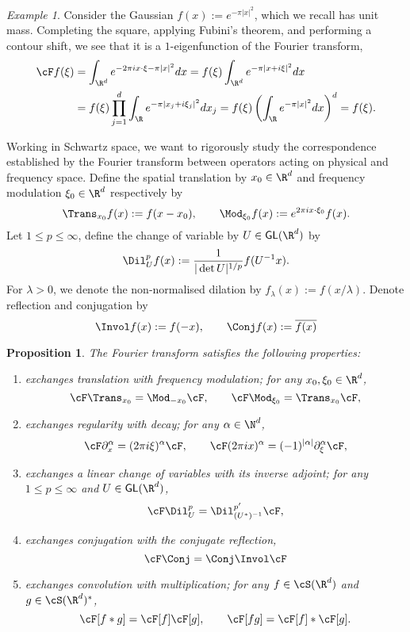 \documentclass[reqno]{amsart}
\newtheorem{proposition}[theorem]{Proposition}
\theoremstyle{definition}
\theoremstyle{remark}
\newtheorem*{example}{Example}
\begin{document}
\begin{example}
	Consider the Gaussian $f(x) := e^{-\pi |x|^2}$, which we recall has unit mass. Completing the square, applying Fubini's theorem, and performing a contour shift, we see that it is a $1$-eigenfunction of the Fourier transform, 
	\begin{align*}
		\cF f(\xi) 
			&= \int_{\R^d} e^{-2\pi i x \cdot \xi - \pi |x|^2} d x = f(\xi) \int_{\R^d} e^{-\pi |x + i \xi|^2} d x \\
			&= f(\xi) \prod_{j = 1}^d  \int_{\R} e^{-\pi |x_j + i \xi_j|^2} d x_j = f(\xi) \left( \int_{\R} e^{-\pi |x|^2} d x\right)^d = f(\xi).
	\end{align*}		
\end{example}

Working in Schwartz space, we want to rigorously study the correspondence established by the Fourier transform between operators acting on physical and frequency space. Define the spatial translation by $x_0 \in \R^d$ and frequency modulation $\xi_0 \in \R^d$ respectively by
	\[ \Trans_{x_0} f(x) := f(x - x_0), \qquad \Mod_{\xi_0} f(x) := e^{2\pi i x \cdot \xi_0} f(x). \]
Let $1 \leq p \leq \infty$, define the change of variable by $U \in \mathsf{GL} (\R^d)$ by
	\[  \Dil_U^p f(x) := \frac{1}{|\det U|^{1/p}} f(U^{-1} x). \]
For $\lambda > 0$, we denote the non-normalised dilation by $f_\lambda (x) := f(x/\lambda)$. Denote reflection and conjugation by
	\[ \Invol f (x) := f(-x), \qquad \Conj f (x) := \overline{f(x)} \]
	

\begin{proposition}
	The Fourier transform satisfies the following properties:
	\begin{enumerate}
		\item exchanges translation with frequency modulation; for any $x_0, \xi_0 \in \R^d$, 
						\[ \cF \Trans_{x_0} = \Mod_{-x_0} \cF, \qquad \cF \Mod_{\xi_0} = \Trans_{x_0} \cF , \]
		\item exchanges regularity with decay; for any $\alpha \in \N^d$,
						\[ \cF \partial_x^\alpha  = (2\pi i  \xi)^\alpha \cF , \qquad \cF (2\pi ix)^\alpha = (-1)^{|\alpha|} \partial_\xi^\alpha \cF, \] 
		\item exchanges a linear change of variables with its inverse adjoint; for any $1 \leq p \leq \infty$ and $U \in \mathsf{GL} (\R^d)$, 
						\[ \cF \Dil^p_U = \Dil^{p'}_{(U^*)^{-1}} \cF,\]
		\item exchanges conjugation with the conjugate reflection,
			\[ \cF \Conj = \Conj \Invol \cF \]
											
		\item exchanges convolution with multiplication; for any $f \in \cS (\R^d)$ and $g \in \cS (\R^d)^*$, 
						\[ \cF [f * g] = \cF [f] \cF[g], \qquad \cF[fg] = \cF[f] * \cF[g]. \]			

	\end{enumerate}
	\label{prop:symmetry}
\end{proposition}
\end{document}
